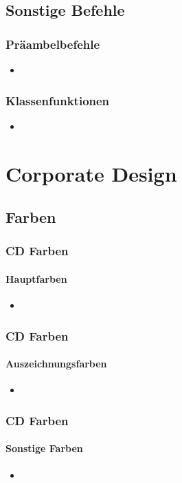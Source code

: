 \documentclass[german,aspectratio=169,notoc,titlestyle=tud,draft]{tudbeamer}%
\begin{document}
\subsection{Sonstige Befehle}
\begin{frame}
	\frametitle{Präambelbefehle}

	\begin{itemize}
		\item 
	\end{itemize}

\end{frame}

\begin{frame}
	\frametitle{Klassenfunktionen}

	\begin{itemize}
		\item 
	\end{itemize}

\end{frame}

\section{Corporate Design}
\subsection{Farben}

\begin{frame}
	\frametitle{CD Farben}
	\framesubtitle{Hauptfarben}

	\begin{itemize}
		\item 
	\end{itemize}

\end{frame}
\begin{frame}
	\frametitle{CD Farben}
	\framesubtitle{Auszeichnungsfarben}

	\begin{itemize}
		\item 
	\end{itemize}

\end{frame}
\begin{frame}
	\frametitle{CD Farben}
	\framesubtitle{Sonstige Farben}

	\begin{itemize}
		\item 
	\end{itemize}

\end{frame}
\end{document}
